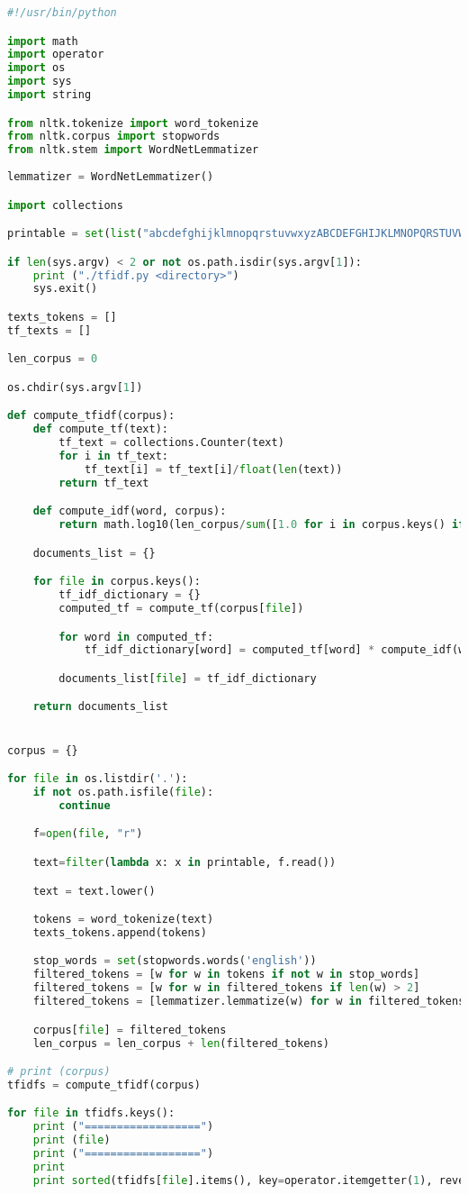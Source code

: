 \documentclass[12pt, a4paper] {article}
\begin{document}
\begin{lstlisting}[language=Python,caption=Результат выполнения алгоритма tf-idf,label=lst:tfidf]
#!/usr/bin/python

import math
import operator
import os
import sys
import string

from nltk.tokenize import word_tokenize
from nltk.corpus import stopwords
from nltk.stem import WordNetLemmatizer 
  
lemmatizer = WordNetLemmatizer() 

import collections

printable = set(list("abcdefghijklmnopqrstuvwxyzABCDEFGHIJKLMNOPQRSTUVWXYZ "))

if len(sys.argv) < 2 or not os.path.isdir(sys.argv[1]):
    print ("./tfidf.py <directory>")
    sys.exit()

texts_tokens = []
tf_texts = []

len_corpus = 0

os.chdir(sys.argv[1])

def compute_tfidf(corpus):
    def compute_tf(text):
        tf_text = collections.Counter(text)
        for i in tf_text:
            tf_text[i] = tf_text[i]/float(len(text))
        return tf_text

    def compute_idf(word, corpus):
        return math.log10(len_corpus/sum([1.0 for i in corpus.keys() if word in corpus[i]]))

    documents_list = {}

    for file in corpus.keys():
        tf_idf_dictionary = {}
        computed_tf = compute_tf(corpus[file])

        for word in computed_tf:
            tf_idf_dictionary[word] = computed_tf[word] * compute_idf(word, corpus)

        documents_list[file] = tf_idf_dictionary

    return documents_list


corpus = {}

for file in os.listdir('.'):
    if not os.path.isfile(file):
        continue

    f=open(file, "r")

    text=filter(lambda x: x in printable, f.read())

    text = text.lower()

    tokens = word_tokenize(text)
    texts_tokens.append(tokens)

    stop_words = set(stopwords.words('english'))
    filtered_tokens = [w for w in tokens if not w in stop_words] 
    filtered_tokens = [w for w in filtered_tokens if len(w) > 2]
    filtered_tokens = [lemmatizer.lemmatize(w) for w in filtered_tokens]

    corpus[file] = filtered_tokens
    len_corpus = len_corpus + len(filtered_tokens)

# print (corpus)
tfidfs = compute_tfidf(corpus)

for file in tfidfs.keys():
    print ("==================")
    print (file)
    print ("==================")
    print
    print sorted(tfidfs[file].items(), key=operator.itemgetter(1), reverse=True)[:30]
\end{lstlisting}
\end{document}
